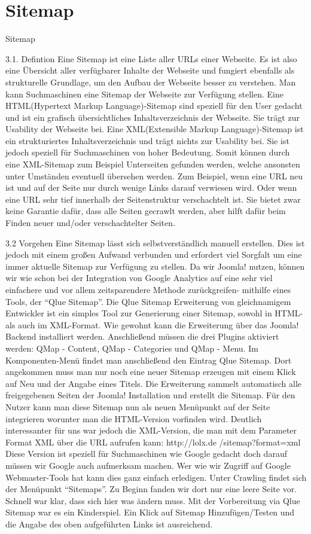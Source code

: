 \chapter{Sitemap}

Sitemap

3.1. Defintion
Eine Sitemap ist eine Liste aller URLs einer Webseite. Es ist also eine Übersicht aller verfügbarer Inhalte der Webseite und fungiert ebenfalls als strukturelle Grundlage, um den Aufbau der Webseite besser zu verstehen. 
Man kann Suchmaschinen eine Sitemap der Webseite zur Verfügung stellen. 
Eine HTML(Hypertext Markup Language)-Sitemap sind speziell für den User gedacht und ist ein grafisch übersichtliches Inhaltsverzeichnis der Webseite. Sie trägt zur Usability der Webseite bei.
Eine XML(Extensible Markup Language)-Sitemap ist ein strukturiertes Inhaltsverzeichnis und trägt nichts zur Usability bei. Sie ist jedoch speziell für Suchmaschinen von hoher Bedeutung.
Somit können durch eine XML-Sitemap zum Beispiel Unterseiten gefunden werden, welche ansonsten unter Umständen eventuell übersehen werden. Zum Beispiel, wenn eine URL neu ist und auf der Seite nur durch wenige Links darauf verwiesen wird.  Oder wenn eine URL sehr tief innerhalb der Seitenstruktur verschachtelt ist. 
Sie bietet zwar keine Garantie dafür, dass alle Seiten gecrawlt werden, aber hilft dafür beim Finden neuer und/oder verschachtelter Seiten.

3.2 Vorgehen
Eine Sitemap lässt sich selbstverständlich manuell erstellen. Dies ist jedoch mit einem großen Aufwand verbunden und erfordert viel Sorgfalt um eine immer aktuelle Sitemap zur Verfügung zu stellen. Da wir Joomla! nutzen, können wir wie schon bei der Integration von Google Analytics auf eine sehr viel einfachere und vor allem zeitsparendere Methode zurückgreifen- mithilfe eines Tools, der “Qlue Sitemap”.
Die Qlue Sitemap Erweiterung von gleichnamigem Entwickler ist ein simples Tool zur Generierung einer Sitemap, sowohl in HTML- als auch im XML-Format. 
Wie gewohnt kann die Erweiterung über das Joomla! Backend installiert werden. Anschließend müssen die drei Plugins aktiviert werden: QMap - Content, QMap - Categories und QMap - Menu. 
Im Komponenten-Menü findet man anschließend den Eintrag Qlue Sitemap. Dort angekommen muss man nur noch eine neuer Sitemap erzeugen mit einem Klick auf Neu und der Angabe eines Titels. Die Erweiterung sammelt automatisch alle freigegebenen Seiten der Joomla! Installation und erstellt die Sitemap.
Für den Nutzer kann man diese Sitemap nun als neuen Menüpunkt auf der Seite integrieren worunter man die HTML-Version vorfinden wird. Deutlich interessanter für uns war jedoch die XML-Version, die man mit dem Parameter Format XML über die URL aufrufen kann:
http://lolx.de /sitemap?format=xml
Diese Version ist speziell für Suchmaschinen wie Google gedacht doch darauf müssen wir Google auch aufmerksam machen. Wer wie wir Zugriff auf Google Webmaster-Tools hat kann dies ganz einfach erledigen. Unter Crawling findet sich der Menüpunkt “Sitemaps”. Zu Beginn fanden wir dort nur eine leere Seite vor. Schnell war klar, dass sich hier was ändern muss. Mit der Vorbereitung via Qlue Sitemap war es ein Kinderspiel. Ein Klick auf Sitemap Hinzufügen/Testen und die Angabe des oben aufgeführten Links ist ausreichend.

